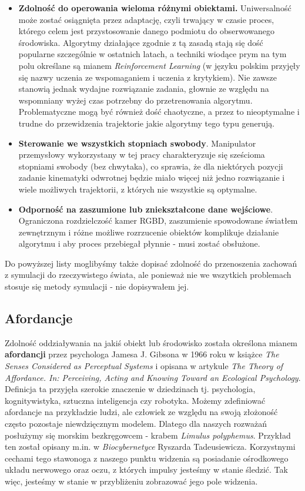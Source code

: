 \documentclass{article}
\begin{document}
\begin{itemize}
\item \textbf{Zdolność do operowania wieloma różnymi obiektami.} Uniwersalność może zostać osiągnięta przez adaptację, czyli trwający w czasie proces, którego celem jest przystosowanie danego podmiotu do obserwowanego środowiska. Algorytmy działające zgodnie z tą zasadą stają się dość popularne szczególnie w ostatnich latach, a techniki wiodące prym na tym polu określane są mianem \emph{Reinforcement Learning} (w języku polskim przyjęły się nazwy uczenia ze wspomaganiem i uczenia z krytykiem). Nie zawsze stanowią jednak wydajne rozwiązanie zadania, głownie ze względu na wspomniany wyżej czas potrzebny do przetrenowania algorytmu. Problematyczne mogą być również dość chaotyczne, a przez to nieoptymalne i trudne do przewidzenia trajektorie jakie algorytmy tego typu generują.

\item \textbf{Sterowanie we wszystkich stopniach swobody}. Manipulator przemysłowy wykorzystany w tej pracy charakteryzuje się sześcioma stopniami swobody (bez chwytaka), co sprawia, że dla niektórych pozycji zadanie kinematyki odwrotnej będzie miało więcej niż jedno rozwiązanie i wiele możliwych trajektorii, z których nie wszystkie są optymalne.

\item \textbf{Odporność na zaszumione lub zniekształcone dane wejściowe}. Ograniczona rozdzielczość kamer RGBD, zaszumienie spowodowane światłem zewnętrznym i różne możliwe rozrzucenie obiektów komplikuje działanie algorytmu i aby proces przebiegał płynnie - musi zostać obsłużone.
\end{itemize}

Do powyższej listy moglibyśmy także dopisać zdolność do przenoszenia zachowań z symulacji do rzeczywistego świata, ale ponieważ nie we wszytkich problemach stosuje się metody symulacji - nie dopisywałem jej.

\subsection{\LARGE{Afordancje}}
Zdolność oddziaływania na jakiś obiekt lub środowisko została określona mianem \textbf{afordancji} przez psychologa Jamesa J. Gibsona w 1966 roku w książce \emph{The Senses Considered as Perceptual Systems} i opisana w artykule \emph{The  Theory  of  Affordance.  In:  Perceiving,  Acting  and  Knowing  Toward  an Ecological Psychology}. Definicja ta przyjęła szerokie znaczenie w dziedzinach tj. psychologia, kognitywistyka, sztuczna inteligencja czy robotyka. Możemy zdefiniować afordancje na przykładzie ludzi, ale człowiek ze względu na swoją złożoność często pozostaje niewdzięcznym modelem. Dlatego dla naszych rozważań posłużymy się morskim bezkręgowcem - krabem \emph{Limulus polyphemus}. Przykład ten został opisany m.in. w \emph{Biocybernetyce} Ryszarda Tadeusiewicza. Korzystnymi cechami tego stawonoga z naszego punktu widzenia są posiadanie ośrodkowego układu nerwowego oraz oczu, z których impulsy jesteśmy w stanie śledzić. Tak więc, jesteśmy w stanie w przybliżeniu zobrazować jego pole widzenia. 
\end{document}
